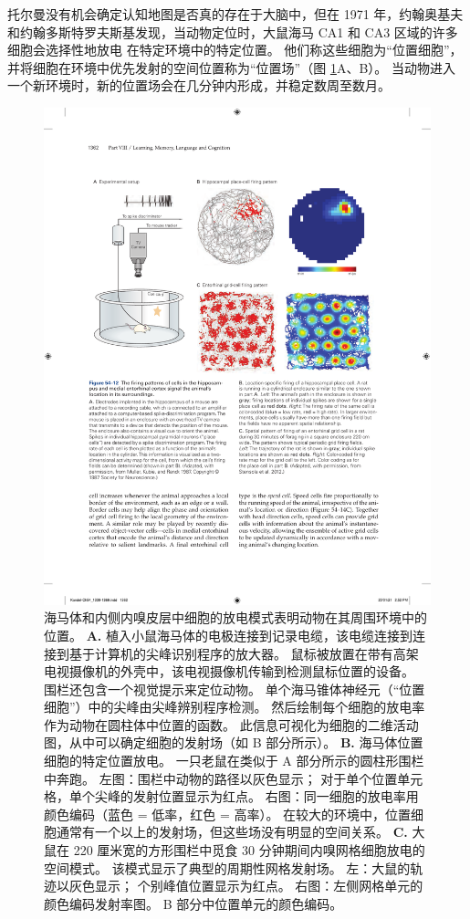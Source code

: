 托尔曼没有机会确定认知地图是否真的存在于大脑中，但在 1971 年，约翰奥基夫和约翰多斯特罗夫斯基发现，当动物定位时，大鼠海马 CA1 和 CA3 区域的许多细胞会选择性地放电 在特定环境中的特定位置。
他们称这些细胞为“位置细胞”，并将细胞在环境中优先发射的空间位置称为“位置场”（图 \ref{fig:54_12}A、B）。
当动物进入一个新环境时，新的位置场会在几分钟内形成，并稳定数周至数月。


\begin{figure}[htbp]
	\centering
	\includegraphics[width=0.9\linewidth]{chap54/fig_54_12}
	\caption{海马体和内侧内嗅皮层中细胞的放电模式表明动物在其周围环境中的位置。
		\textbf{A.} 植入小鼠海马体的电极连接到记录电缆，该电缆连接到连接到基于计算机的尖峰识别程序的放大器。
		鼠标被放置在带有高架电视摄像机的外壳中，该电视摄像机传输到检测鼠标位置的设备。
		围栏还包含一个视觉提示来定位动物。
		单个海马锥体神经元（“位置细胞”）中的尖峰由尖峰辨别程序检测。
		然后绘制每个细胞的放电率作为动物在圆柱体中位置的函数。
		此信息可视化为细胞的二维活动图，从中可以确定细胞的发射场（如 B 部分所示）\cite{muller1987spatial}。
		\textbf{B.} 海马体位置细胞的特定位置放电。
		一只老鼠在类似于 A 部分所示的圆柱形围栏中奔跑。
		左图：围栏中动物的路径以灰色显示；
		对于单个位置单元格，单个尖峰的发射位置显示为红点。
		右图：同一细胞的放电率用颜色编码（蓝色 = 低率，红色 = 高率）。
		在较大的环境中，位置细胞通常有一个以上的发射场，但这些场没有明显的空间关系。
		\textbf{C.} 大鼠在 220 厘米宽的方形围栏中觅食 30 分钟期间内嗅网格细胞放电的空间模式。
		该模式显示了典型的周期性网格发射场。
		左：大鼠的轨迹以灰色显示；
		个别峰值位置显示为红点。
		右图：左侧网格单元的颜色编码发射率图。
		B 部分中位置单元的颜色编码\cite{stensola2012entorhinal}。}
	\label{fig:54_12}
\end{figure}


